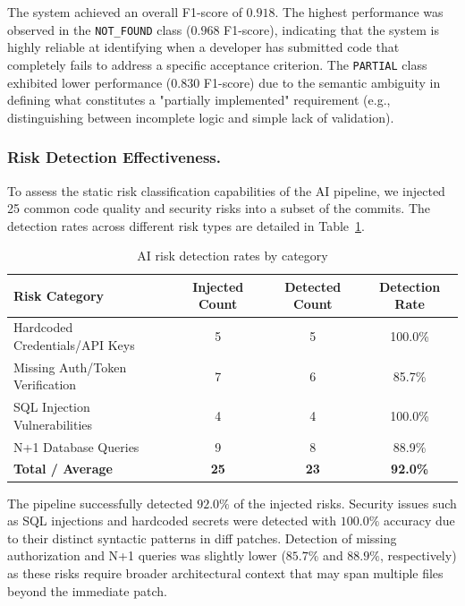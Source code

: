 The system achieved an overall F1-score of $0.918$. The highest performance was observed in the \texttt{NOT\_FOUND} class ($0.968$ F1-score), indicating that the system is highly reliable at identifying when a developer has submitted code that completely fails to address a specific acceptance criterion. The \texttt{PARTIAL} class exhibited lower performance ($0.830$ F1-score) due to the semantic ambiguity in defining what constitutes a "partially implemented" requirement (e.g., distinguishing between incomplete logic and simple lack of validation).

\subsubsection{Risk Detection Effectiveness.}
To assess the static risk classification capabilities of the AI pipeline, we injected 25 common code quality and security risks into a subset of the commits. The detection rates across different risk types are detailed in Table~\ref{tab:risk_detection}.

\begin{table}
\centering
\caption{AI risk detection rates by category}
\label{tab:risk_detection}
\begin{tabular}{lccc}
\toprule
\textbf{Risk Category} & \textbf{Injected Count} & \textbf{Detected Count} & \textbf{Detection Rate} \\
\midrule
Hardcoded Credentials/API Keys & 5 & 5 & 100.0\% \\
Missing Auth/Token Verification & 7 & 6 & 85.7\% \\
SQL Injection Vulnerabilities   & 4 & 4 & 100.0\% \\
N+1 Database Queries            & 9 & 8 & 88.9\% \\
\midrule
\textbf{Total / Average}        & \textbf{25} & \textbf{23} & \textbf{92.0\%} \\
\bottomrule
\end{tabular}
\end{table}

The pipeline successfully detected $92.0\%$ of the injected risks. Security issues such as SQL injections and hardcoded secrets were detected with $100.0\%$ accuracy due to their distinct syntactic patterns in diff patches. Detection of missing authorization and N+1 queries was slightly lower ($85.7\%$ and $88.9\%$, respectively) as these risks require broader architectural context that may span multiple files beyond the immediate patch.

